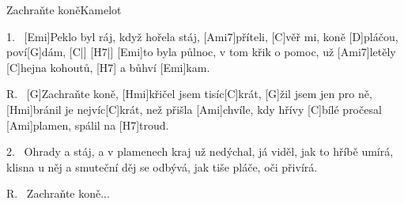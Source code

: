 \begin{song}{Zachraňte koně}{Kamelot}

\begin{xverse}{1.~}
[Emi]Peklo byl ráj, když hořela stáj, [Ami7]příteli,
[C]věř mi, koně [D]pláčou, poví[G]dám, [C|]{} [H7|]{}
[Emi]to byla půlnoc, v tom křik o pomoc, už [Ami7]letěly
[C]hejna kohoutů, [H7]{} a bůhví [Emi]kam.
\end{xverse}

\begin{xverse}{R.~}
[G]Zachraňte koně, [Hmi]křičel jsem tisíc[C]krát,
[G]{žil} jsem jen pro ně, [Hmi]bránil je nejvíc[C]krát,
než přišla [Ami]chvíle, kdy hřívy [C]bílé
pročesal [Ami]plamen, spálil na [H7]troud.
\end{xverse}

\begin{xverse}{2.~}
Ohrady a stáj, a v plamenech kraj už nedýchal,
já viděl, jak to hříbě umírá,
klisna u něj a smuteční děj se odbývá,
jak tiše pláče, oči přivírá.
\end{xverse}

\begin{xverse}{R.~}
Zachraňte koně...
\end{xverse}

\end{song}
\chords{ \chordAmiSeven }

